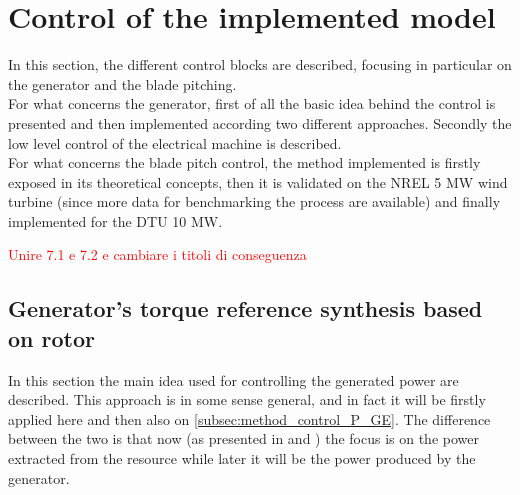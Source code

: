 \newpage
\section{Control of the implemented model}\label{sec:c_basic_model_control}
In this section, the different control blocks are described, focusing in particular on the generator and the blade pitching. \\
For what concerns the generator, first of all the basic idea behind the control is presented and then implemented according two different approaches. Secondly the low level control of the electrical machine is described.\\
For what concerns the blade pitch control, the method implemented is firstly exposed in its theoretical concepts, then it is validated on the NREL 5 MW wind turbine (since more data for benchmarking the process are available) and finally implemented for the DTU 10 MW.   

\textcolor{red}{Unire 7.1 e 7.2 e cambiare i titoli di conseguenza}

\subsection{Generator's torque reference synthesis based on rotor}\label{subsec:torque_reference}
In this section the main idea used for controlling the generated power are described. This approach is in some sense general, and in fact it will be firstly applied here and then also on \autoref{subsec:method_control_P_GE}. The difference between the two is that now (as presented in \cite{Aerodynamics_of_wind_turbines} and \cite{SMILDEN2016386}) the focus is on the power extracted from the resource while later it will be the power produced by the generator.

